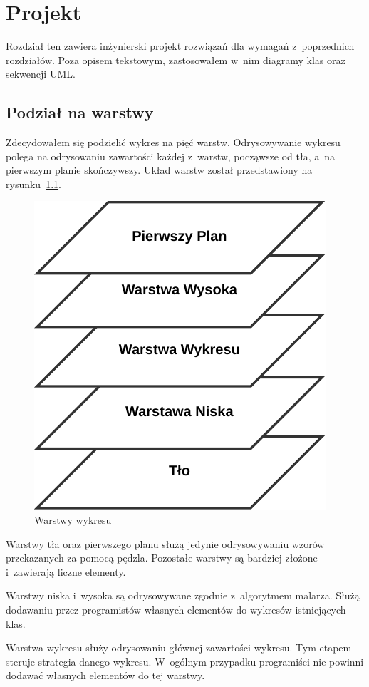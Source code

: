 \chapter{Projekt}\label{chap:proj}\lstset{language=C++}
Rozdział ten zawiera inżynierski projekt rozwiązań dla wymagań z~poprzednich rozdziałów. Poza opisem tekstowym, zastosowałem w~nim diagramy klas oraz sekwencji UML.

\section{Podział na warstwy}
Zdecydowałem się podzielić wykres na pięć warstw. Odrysowywanie wykresu polega na odrysowaniu zawartości każdej z~warstw, począwsze od tła, a~na pierwszym planie skończywszy.
Układ warstw został przedstawiony na rysunku~\ref{rys:warstwy}.

\begin{figure}[H]
\centering
\includegraphics{img/warstwy.pdf}
\caption{Warstwy wykresu}\label{rys:warstwy}
\end{figure}

Warstwy tła oraz pierwszego planu służą jedynie odrysowywaniu wzorów przekazanych za pomocą pędzla. Pozostałe warstwy są bardziej złożone i~zawierają liczne elementy.

Warstwy niska i~wysoka są odrysowywane zgodnie z~algorytmem malarza. Służą dodawaniu przez programistów własnych elementów do wykresów istniejących klas.

Warstwa wykresu służy odrysowaniu głównej zawartości wykresu. Tym etapem steruje strategia danego wykresu. W~ogólnym przypadku programiści nie powinni dodawać własnych elementów do tej warstwy.

